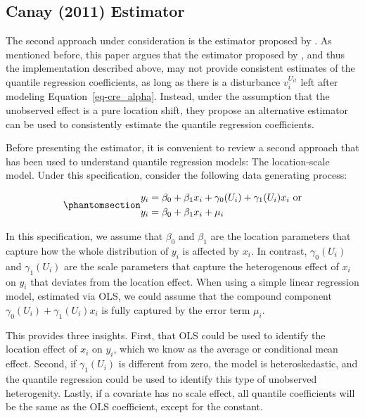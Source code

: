 \documentclass[bib]{statapress}
\begin{document}
\subsection{Canay (2011) Estimator}\label{sec-canay}

The second approach under consideration is the estimator proposed by
\citet{canay2011}. As mentioned before, this paper argues that the
estimator proposed by \citet{abrevaya2008}, and thus the implementation
described above, may not provide consistent estimates of the quantile
regression coefficients, as long as there is a disturbance
\(v^{U_{it}}_i\) left after modeling Equation~\ref{eq-cre_alpha}.
Instead, under the assumption that the unobserved effect is a pure
location shift, they propose an alternative estimator can be used to
consistently estimate the quantile regression coefficients.

Before presenting the estimator, it is convenient to review a second
approach that has been used to understand quantile regression models:
The location-scale model. Under this specification, consider the
following data generating process:

\begin{equation}\phantomsection\label{eq-loc-scale}{\begin{aligned}
y_i &= \beta_0+\beta_1 x_i + \gamma_0(U_i) + \gamma_1(U_i) x_{i} \ \text{or}\\
y_i &= \beta_0+\beta_1 x_i + \mu_i
\end{aligned}
}\end{equation}

In this specification, we assume that \(\beta_0\) and \(\beta_1\) are
the location parameters that capture how the whole distribution of
\(y_i\) is affected by \(x_i\). In contrast, \(\gamma_0(U_i)\) and
\(\gamma_1(U_i)\) are the scale parameters that capture the heterogenous
effect of \(x_i\) on \(y_i\) that deviates from the location effect.
When using a simple linear regression model, estimated via OLS, we could
assume that the compound component
\(\gamma_0(U_i) + \gamma_1(U_i) x_{i}\) is fully captured by the error
term \(\mu_i\).

This provides three insights. First, that OLS could be used to identify
the location effect of \(x_i\) on \(y_i\), which we know as the average
or conditional mean effect. Second, if \(\gamma_1(U_i)\) is different
from zero, the model is heteroskedastic, and the quantile regression
could be used to identify this type of unobserved heterogenity. Lastly,
if a covariate has no scale effect, all quantile coefficients will be
the same as the OLS coefficient, except for the constant.
\end{document}
